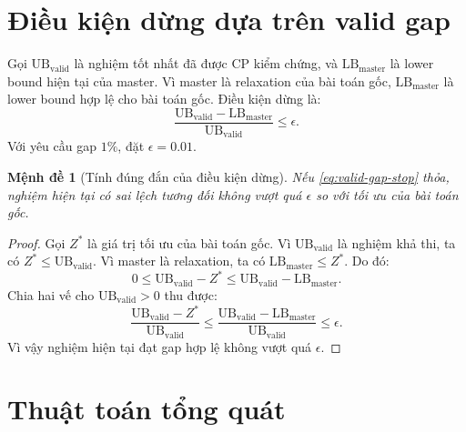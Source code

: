 \documentclass[12pt,a4paper]{article}
\newtheorem{proposition}{Mệnh đề}
\newcommand{\LBM}{\mathrm{LB}_{\mathrm{master}}}
\newcommand{\UBV}{\mathrm{UB}_{\mathrm{valid}}}
\begin{document}
\section{Điều kiện dừng dựa trên valid gap}
\label{sec:valid-gap}

Gọi $\UBV$ là nghiệm tốt nhất đã được CP kiểm chứng, và $\LBM$ là lower bound hiện tại của master. Vì master là relaxation của bài toán gốc, $\LBM$ là lower bound hợp lệ cho bài toán gốc. Điều kiện dừng là:
\begin{equation}
    \frac{\UBV-\LBM}{\UBV}\le \epsilon.
    \label{eq:valid-gap-stop}
\end{equation}
Với yêu cầu gap $1\%$, đặt $\epsilon=0.01$.

\begin{proposition}[Tính đúng đắn của điều kiện dừng]
Nếu \eqref{eq:valid-gap-stop} thỏa, nghiệm hiện tại có sai lệch tương đối không vượt quá $\epsilon$ so với tối ưu của bài toán gốc.
\end{proposition}
\begin{proof}
Gọi $Z^*$ là giá trị tối ưu của bài toán gốc. Vì $\UBV$ là nghiệm khả thi, ta có $Z^*\le \UBV$. Vì master là relaxation, ta có $\LBM\le Z^*$. Do đó:
\[
    0\le \UBV-Z^*\le \UBV-\LBM.
\]
Chia hai vế cho $\UBV>0$ thu được:
\[
    \frac{\UBV-Z^*}{\UBV}\le \frac{\UBV-\LBM}{\UBV}\le \epsilon.
\]
Vì vậy nghiệm hiện tại đạt gap hợp lệ không vượt quá $\epsilon$.
\end{proof}

\section{Thuật toán tổng quát}
\label{sec:algorithm}
\end{document}
